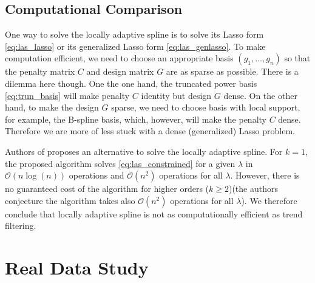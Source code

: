 \documentclass[a4paper]{article}
\renewcommand{\cal}{\mathcal}
\begin{document}
\subsection{Computational Comparison}
One way to solve the locally adaptive spline is to solve its Lasso form \eqref{eq:las_lasso} or its generalized Lasso form \eqref{eq:las_genlasso}. To make computation efficient, we need to choose an appropriate basis $(g_1,\ldots,g_n)$ so that the penalty matrix $C$ and design matrix $G$ are as sparse as possible. There is a dilemma here though. One the one hand, the truncated power basis \eqref{eq:trun_basis} will make penalty $C$ identity but design $G$ dense. On the other hand, to make the design $G$ sparse, we need to choose basis with local support, for example, the B-spline basis, which, however, will make the penalty $C$ dense. Therefore we are more of less stuck with a dense (generalized) Lasso problem.

Authors of \cite{mammen1997locally} proposes an alternative to solve the locally adaptive spline. For $k = 1$, the proposed algorithm solves \eqref{eq:las_constrained} for a given $\lambda$ in $\cal{O}(n\log(n))$ operations and $\cal{O}(n^2)$ operations for all $\lambda$. However, there is no guaranteed cost of the algorithm for higher orders ($k\geq 2$)(the authors conjecture the algorithm takes also $\cal{O}(n^2)$ operations for all $\lambda$). We therefore conclude that locally adaptive spline is not as computationally efficient as trend filtering. 

\section{Real Data Study}
\label{sec:real_data}
\end{document}
